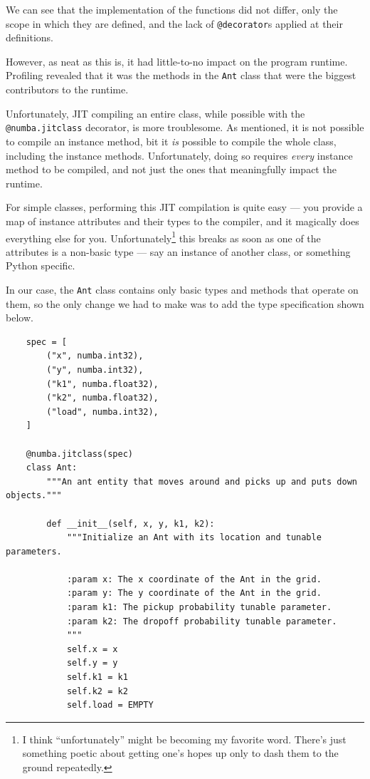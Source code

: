 \documentclass[12pt]{article}
\begin{document}
We can see that the implementation of the functions did not differ, only the scope in which they are defined, and the lack of \texttt{@decorator}s applied at their definitions.

However, as neat as this is, it had little-to-no impact on the program runtime.
Profiling revealed that it was the methods in the \texttt{Ant} class that were the biggest contributors to the runtime.

Unfortunately, JIT compiling an entire class, while possible with the \texttt{@numba.jitclass} decorator, is more troublesome.
As mentioned, it is not possible to compile an instance method, bit it \textit{is} possible to compile the whole class, including the instance methods.
Unfortunately, doing so requires \textit{every} instance method to be compiled, and not just the ones that meaningfully impact the runtime.

For simple classes, performing this JIT compilation is quite easy --- you provide a map of instance attributes and their types to the compiler, and it magically does everything else for you.
Unfortunately\footnote{I think ``unfortunately'' might be becoming my favorite word. There's just something poetic about getting one's hopes up only to dash them to the ground repeatedly.} this breaks as soon as one of the attributes is a non-basic type --- say an instance of another class, or something Python specific.

In our case, the \texttt{Ant} class contains only basic types and methods that operate on them, so the only change we had to make was to add the type specification shown below.

\begin{verbatim}
    spec = [
        ("x", numba.int32),
        ("y", numba.int32),
        ("k1", numba.float32),
        ("k2", numba.float32),
        ("load", numba.int32),
    ]

    @numba.jitclass(spec)
    class Ant:
        """An ant entity that moves around and picks up and puts down objects."""

        def __init__(self, x, y, k1, k2):
            """Initialize an Ant with its location and tunable parameters.

            :param x: The x coordinate of the Ant in the grid.
            :param y: The y coordinate of the Ant in the grid.
            :param k1: The pickup probability tunable parameter.
            :param k2: The dropoff probability tunable parameter.
            """
            self.x = x
            self.y = y
            self.k1 = k1
            self.k2 = k2
            self.load = EMPTY
\end{verbatim}
\end{document}
